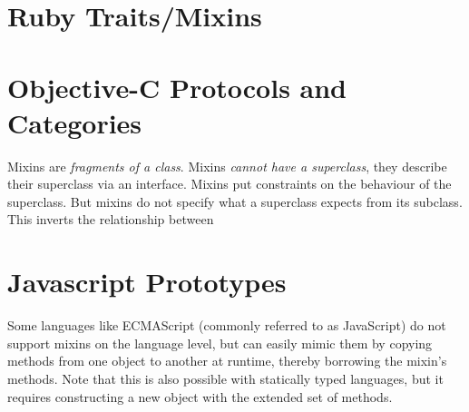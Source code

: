 \section{Ruby Traits/Mixins}

\section{Objective-C Protocols and Categories}



Mixins are \textit{fragments of a class}.
Mixins \textit{cannot have a superclass}, they describe their superclass via an 
interface. Mixins put constraints on the behaviour of the superclass. 
But mixins do not specify what a superclass expects
from its subclass. This inverts the relationship between 

\section{Javascript Prototypes}

Some languages like ECMAScript (commonly referred to as JavaScript) do not support mixins on the language level, but can easily mimic them by copying methods from one object to another at runtime, thereby borrowing the mixin's methods. Note that this is also possible with statically typed languages, but it requires constructing a new object with the extended set of methods.
